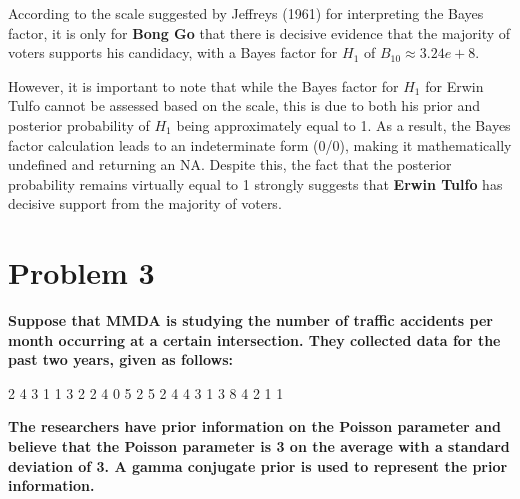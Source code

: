 \documentclass[]{article}
\begin{document}
\begin{enumerate}
According to the scale suggested by Jeffreys (1961) for interpreting the Bayes factor, it is only for \textbf{Bong Go} that there is decisive evidence that the majority of voters supports his candidacy, with a Bayes factor for $H_1$ of $B_{10} \approx 3.24e+8$. 

However, it is important to note that while the Bayes factor for $H_1$ for Erwin Tulfo cannot be assessed based on the scale, this is due to both his prior and posterior probability of $H_1$ being approximately equal to 1. As a result, the Bayes factor calculation leads to an indeterminate form (0/0), making it mathematically undefined and returning an NA. Despite this, the fact that the posterior probability remains virtually equal to 1 strongly suggests that \textbf{Erwin Tulfo} has decisive support from the majority of voters.

\end{enumerate}

\section{Problem 3}
\textbf{Suppose that MMDA is studying the number of traffic accidents per month occurring at
a certain intersection. They collected data for the past two years, given as follows:}
\hfill
\begin{center}
2 4 3 1 1 3 2 2 4 0 5 2 5 2 4 4 3 1 3 8 4 2 1 1
\end{center}
\hfill

\textbf{The researchers have prior information on the Poisson parameter and believe that the
Poisson parameter is 3 on the average with a standard deviation of 3. A gamma conjugate
prior is used to represent the prior information.}
\end{document}
